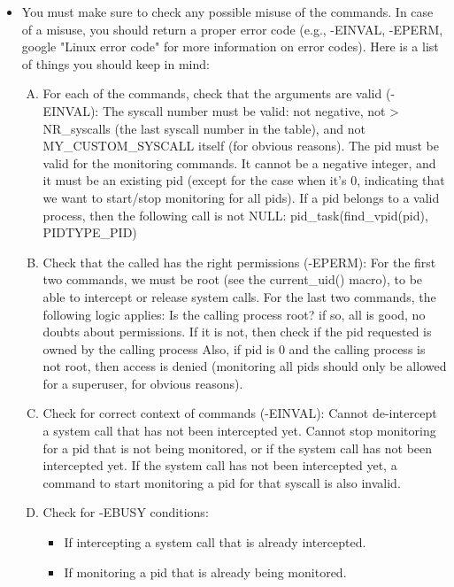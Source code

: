 \documentclass[12pt]{article}
\begin{document}
\begin{itemize}
    \item

    You must make sure to check any possible misuse of the commands. In case of
    a misuse, you should return a proper error code (e.g., -EINVAL, -EPERM, google
    "Linux error code" for more information on error codes). Here is a list of
    things you should keep in mind:

    \bigskip

    \begin{enumerate}[A.]
    \item For each of the commands, check that the arguments are valid (-EINVAL):
    The syscall number must be valid: not negative, not > NR_syscalls (the last syscall number in the table), and not MY_CUSTOM_SYSCALL itself (for obvious reasons).
    The pid must be valid for the monitoring commands. It cannot be a negative integer, and it must be an existing pid (except for the case when it's 0, indicating that we want to start/stop monitoring for all pids).
    If a pid belongs to a valid process, then the following call is not NULL:
        pid_task(find_vpid(pid), PIDTYPE_PID)
    \item Check that the called has the right permissions (-EPERM):
    For the first two commands, we must be root (see the current_uid() macro), to be able to intercept or release system calls.
    For the last two commands, the following logic applies:
    Is the calling process root? if so, all is good, no doubts about permissions.
    If it is not, then check if the pid requested is owned by the calling process
    Also, if pid is 0 and the calling process is not root, then access is denied (monitoring all pids should only be allowed for a superuser, for obvious reasons).
    \item Check for correct context of commands (-EINVAL):
    Cannot de-intercept a system call that has not been intercepted yet.
    Cannot stop monitoring for a pid that is not being monitored, or if the system call has not been intercepted yet. If the system call has not been intercepted yet, a command to start monitoring a pid for that syscall is also invalid.
    \item Check for -EBUSY conditions:
    \begin{itemize}
        \item If intercepting a system call that is already intercepted.
        \item If monitoring a pid that is already being monitored.

\end{itemize}
\end{enumerate}
\end{itemize}
\end{document}
